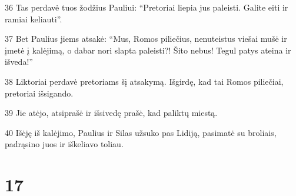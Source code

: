\par 36 Tas perdavė tuos žodžius Pauliui: “Pretoriai liepia jus paleisti. Galite eiti ir ramiai keliauti”. 
\par 37 Bet Paulius jiems atsakė: “Mus, Romos piliečius, nenuteistus viešai mušė ir įmetė į kalėjimą, o dabar nori slapta paleisti?! Šito nebus! Tegul patys ateina ir išveda!” 
\par 38 Liktoriai perdavė pretoriams šį atsakymą. Išgirdę, kad tai Romos piliečiai, pretoriai išsigando. 
\par 39 Jie atėjo, atsiprašė ir išsivedę prašė, kad paliktų miestą. 
\par 40 Išėję iš kalėjimo, Paulius ir Silas užsuko pas Lidiją, pasimatė su broliais, padrąsino juos ir iškeliavo toliau.


\chapter{17}



